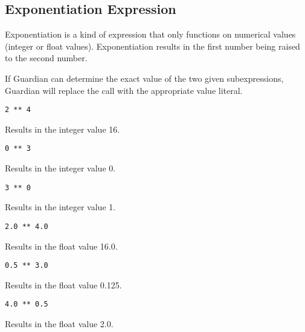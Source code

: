 
\subsection{Exponentiation Expression}
{
	Exponentiation is a kind of expression that only functions on
	numerical values (integer or float values).
	Exponentiation results in the first number being raised to the
	second number.
	
	If Guardian can determine the exact value of the two given subexpressions,
	Guardian will replace the call with the appropriate value literal.
	
	\begin{itemize}
	{
		\item[] \lstinline[language=MAIA, columns=fixed]@2 ** 4@
		
			Results in the integer value 16.
		
		\item[] \lstinline[language=MAIA, columns=fixed]@0 ** 3@
		
			Results in the integer value 0.
		
		\item[] \lstinline[language=MAIA, columns=fixed]@3 ** 0@
		
			Results in the integer value 1.
		
		\item[] \lstinline[language=MAIA, columns=fixed]@2.0 ** 4.0@
		
			Results in the float value 16.0.
		
		\item[] \lstinline[language=MAIA, columns=fixed]@0.5 ** 3.0@
		
			Results in the float value 0.125.
		
		\item[] \lstinline[language=MAIA, columns=fixed]@4.0 ** 0.5@
		
			Results in the float value 2.0.
	}
	\end{itemize}
}
